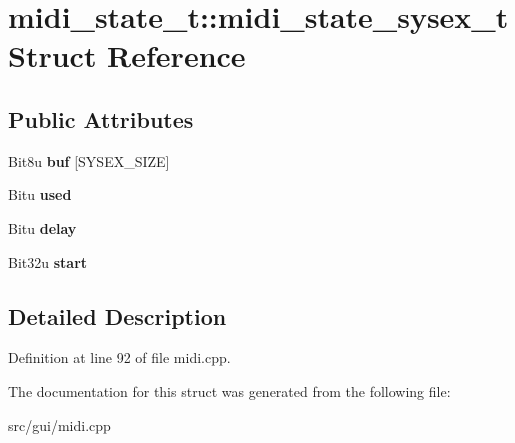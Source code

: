 \hypertarget{structmidi__state__t_1_1midi__state__sysex__t}{\section{midi\-\_\-state\-\_\-t\-:\-:midi\-\_\-state\-\_\-sysex\-\_\-t Struct Reference}
\label{structmidi__state__t_1_1midi__state__sysex__t}
}
\subsection*{Public Attributes}
\begin{DoxyCompactItemize}
\item 
\hypertarget{structmidi__state__t_1_1midi__state__sysex__t_a26ccad0ea37dab3211795086d7cd6c08}{Bit8u {\bfseries buf} \mbox{[}S\-Y\-S\-E\-X\-\_\-\-S\-I\-Z\-E\mbox{]}}\label{structmidi__state__t_1_1midi__state__sysex__t_a26ccad0ea37dab3211795086d7cd6c08}

\item 
\hypertarget{structmidi__state__t_1_1midi__state__sysex__t_a9ce13659168a9f49c3123b5e0008ff5c}{Bitu {\bfseries used}}\label{structmidi__state__t_1_1midi__state__sysex__t_a9ce13659168a9f49c3123b5e0008ff5c}

\item 
\hypertarget{structmidi__state__t_1_1midi__state__sysex__t_a5a400a7d191d984623fecd6e9b5e3e70}{Bitu {\bfseries delay}}\label{structmidi__state__t_1_1midi__state__sysex__t_a5a400a7d191d984623fecd6e9b5e3e70}

\item 
\hypertarget{structmidi__state__t_1_1midi__state__sysex__t_ab00b068e29f512d80af5ec5c401e1547}{Bit32u {\bfseries start}}\label{structmidi__state__t_1_1midi__state__sysex__t_ab00b068e29f512d80af5ec5c401e1547}

\end{DoxyCompactItemize}


\subsection{Detailed Description}


Definition at line 92 of file midi.\-cpp.



The documentation for this struct was generated from the following file\-:\begin{DoxyCompactItemize}
\item 
src/gui/midi.\-cpp\end{DoxyCompactItemize}
